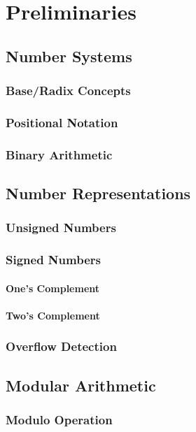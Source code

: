 \chapter{Preliminaries}\label{chapt:preliminaries}
\minitoc
\lipsum[1]

\section{Number Systems}
\lipsum[1]
\subsection{Base/Radix Concepts}
\lipsum[1]
\subsection{Positional Notation}
\lipsum[1]
\subsection{Binary Arithmetic}
\lipsum[1]

\section{Number Representations}
\lipsum[1]
\subsection{Unsigned Numbers}
\lipsum[1]
\subsection{Signed Numbers}
\lipsum[1]
\subsubsection{One's Complement}
\lipsum[1]
\subsubsection{Two's Complement}
\lipsum[1]
\subsection{Overflow Detection}
\lipsum[1]

\section{Modular Arithmetic}
\lipsum[1]
\subsection{Modulo Operation}
\lipsum[1]
